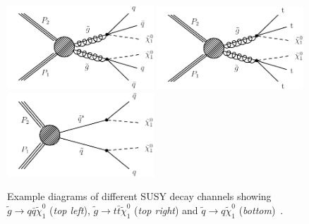 \begin{figure}[!t]
  \centering
  \begin{minipage}[c]{1.\textwidth}
    \begin{center}
      \includegraphics[width=0.49\textwidth]{figures/T1qqqq.pdf}  
      \includegraphics[width=0.49\textwidth]{figures/T1tttt_feyn.pdf} \\
      \includegraphics[width=0.49\textwidth]{figures/T2qq.pdf}
    \end{center}
  \end{minipage}
  \caption{Example diagrams of different SUSY decay channels showing $\tilde{g} \rightarrow q\bar{q} \tilde{\chi}_1^0$ (\textit{top left}), $\tilde{g} \rightarrow t\bar{t}\tilde{\chi}_1^0$ (\textit{top right}) and $\tilde{q} \rightarrow q\tilde{\chi}_1^0$ (\textit{bottom})~\cite{bib:CMS:PhysicsResultsSUS}.}
  \label{fig:susy_decay}
\end{figure}
\\
